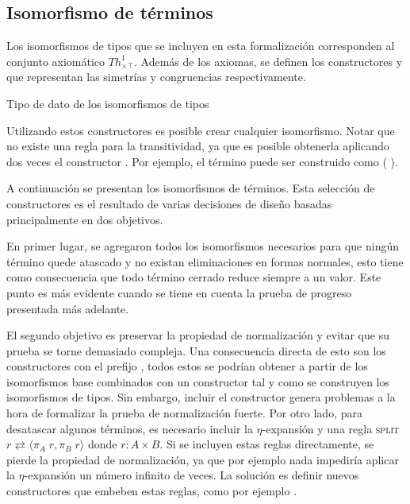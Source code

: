 \documentclass[]{report}
\begin{document}
	
	\subsection{Isomorfismo de términos}
	
	Los isomorfismos de tipos que se incluyen en esta formalización corresponden al conjunto axiomático $Th^1_{\times\top}$.
	Además de los axiomas, se definen los constructores  y  que representan las simetrías y congruencias respectivamente.
	
	\begin{codigo}
		Tipo de dato de los isomorfismos de tipos
		
	\end{codigo}
	
	Utilizando estos constructores es posible crear cualquier isomorfismo.
	Notar que no existe una regla para la transitividad, ya que es posible obtenerla aplicando dos veces el constructor \AgdaInductiveConstructor{$[\_]\equiv\_$}.
	Por ejemplo, el término \AgdaInductiveConstructor{[ trans}   \AgdaInductiveConstructor{]$\equiv$}  puede ser construido como \AgdaInductiveConstructor{[}  \AgdaInductiveConstructor{]$\equiv$} (\AgdaInductiveConstructor{[}  \AgdaInductiveConstructor{]$\equiv$} ).
	
	A continuación se presentan los isomorfismos de términos.
	Esta selección de constructores es el resultado de varias decisiones de diseño basadas principalmente en dos objetivos.
	
	En primer lugar, se agregaron todos los isomorfismos necesarios para que ningún término quede atascado y no existan eliminaciones en formas normales, esto tiene como consecuencia que todo término cerrado reduce siempre a un valor.
	Este punto es más evidente cuando se tiene en cuenta la prueba de progreso presentada más adelante.
	
	El segundo objetivo es preservar la propiedad de normalización y evitar que su prueba se torne demasiado compleja.
	Una consecuencia directa de esto son los constructores con el prefijo , todos estos se podrían obtener a partir de los isomorfismos base combinados con un constructor  tal y como se construyen los isomorfismos de tipos.
	Sin embargo, incluir el constructor  genera problemas a la hora de formalizar la prueba de normalización fuerte.
	Por otro lado, para desatascar algunos términos, es necesario incluir la $\eta$-expansión y una regla \textsc{split} $r \rightleftarrows \langle \pi_A\; r , \pi_B\; r \rangle$ donde $r: A \times B$.
	Si se incluyen estas reglas directamente, se pierde la propiedad de normalización, ya que por ejemplo nada impediría aplicar la $\eta$-expansión un número infinito de veces.
	La solución es definir nuevos constructores que embeben estas reglas, como por ejemplo .
	
\end{document}
